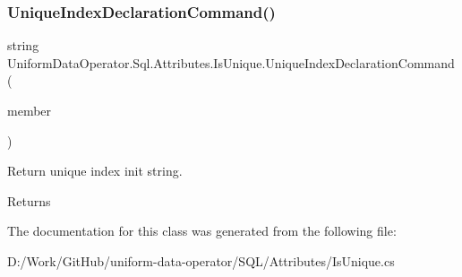 \subsubsection{\texorpdfstring{Unique\+Index\+Declaration\+Command()}{UniqueIndexDeclarationCommand()}}
{\footnotesize\ttfamily string Uniform\+Data\+Operator.\+Sql.\+Attributes.\+Is\+Unique.\+Unique\+Index\+Declaration\+Command (\begin{DoxyParamCaption}\item[{Member\+Info}]{member }\end{DoxyParamCaption})}



Return unique index init string. 

\begin{DoxyReturn}{Returns}

\end{DoxyReturn}


The documentation for this class was generated from the following file\+:\begin{DoxyCompactItemize}
\item 
D\+:/\+Work/\+Git\+Hub/uniform-\/data-\/operator/\+S\+Q\+L/\+Attributes/Is\+Unique.\+cs\end{DoxyCompactItemize}
